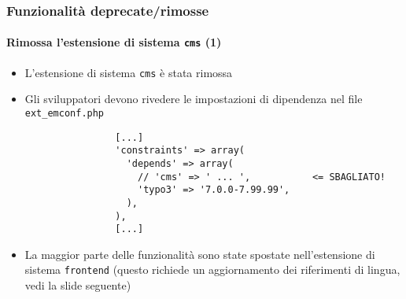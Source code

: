 \begin{frame}[fragile]
	\frametitle{Funzionalità deprecate/rimosse}
	\framesubtitle{Rimossa l'estensione di sistema \texttt{cms} (1)}

	\lstset{basicstyle=\tiny\ttfamily}

	\begin{itemize}

		\item L'estensione di sistema \texttt{cms} è stata rimossa

		\item Gli sviluppatori devono rivedere le impostazioni di dipendenza nel file \texttt{ext\_emconf.php}

			\begin{lstlisting}
				[...]
				'constraints' => array(
				  'depends' => array(
				    // 'cms' => ' ... ',           <= SBAGLIATO!
				    'typo3' => '7.0.0-7.99.99',
				  ),
				),
				[...]
			\end{lstlisting}

		\item La maggior parte delle funzionalità sono state spostate nell'estensione di sistema \texttt{frontend}
			(questo richiede un aggiornamento dei riferimenti di lingua, vedi la slide seguente)

	\end{itemize}

\end{frame}


